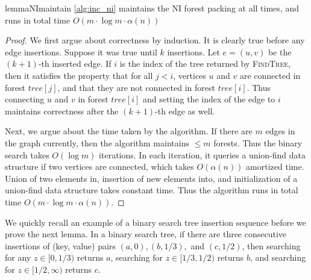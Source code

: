 \documentclass[11pt,a4paper]{article}
\begin{document}
\begin{restatable}{lemma}{NImaintain}
\label{lem:NImaintain}
\cref{alg:inc_ni} maintains the NI forest packing at all times, and runs in total time $O(m \cdot \log m \cdot \alpha(n))$
\end{restatable}
\begin{proof}
We first argue about correctness by induction. It is clearly true before any edge insertions. Suppose it was true until $k$ insertions. Let $e=(u,v)$ be the $(k+1)$-th inserted edge. If $i$ is the index of the tree returned by \textsc{FindTree}, then it satisfies the property that for all $j < i$, vertices $u$ and $v$ are connected in forest $tree[j]$, and that they are not connected in forest $tree[i]$. Thus connecting $u$ and $v$ in forest $tree[i]$ and setting the index of the edge to $i$ maintains correctness after the $(k+1)$-th edge as well.

Next, we argue about the time taken by the algorithm. If there are $m$ edges in the graph currently, then the algorithm maintains $\le m$ forests. Thus the binary search takes $O(\log m)$ iterations. In each iteration, it queries a union-find data structure if two vertices are connected, which takes $O(\alpha(n))$ amortized time. Union of two elements in, insertion of new elements into, and initialization of a union-find data structure takes constant time. Thus the algorithm runs in total time $O(m \cdot \log m \cdot \alpha(n))$.
\end{proof}

We quickly recall an example of a binary search tree insertion sequence before we prove the next lemma. In a binary search tree, if there are three consecutive insertions of (key, value) pairs $(a, 0), (b, 1/3),$ and $(c, 1/2)$, then searching for any $z \in [0, 1/3)$ returns $a$, searching for $z \in [1/3, 1/2)$ returns $b$, and searching for $z \in [1/2, \infty)$ returns $c$.
\end{document}
